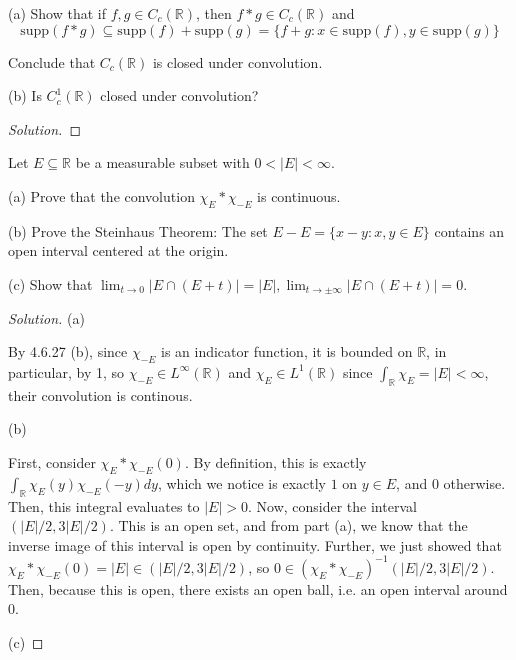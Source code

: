 \documentclass[10pt]{article}
\newcommand{\supp}{{\text{supp}}}
\newenvironment{problem}[2][Problem]{\begin{trivlist}
\item[\hskip \labelsep {\bfseries #1}\hskip \labelsep {\bfseries #2.}]}{\end{trivlist}}
\begin{document}
\begin{problem}{4.6.28}

(a) Show that if $f,g \in C_c(\mathbb{R})$, then $f \ast g \in C_c(\mathbb{R})$ and $$\supp(f \ast g) \subseteq \supp(f) + \supp(g) = \{ f + g : x \in \supp(f), y \in \supp(g) \}$$

Conclude that $C_c(\mathbb{R})$ is closed under convolution.

(b) Is $C_c^1(\mathbb{R})$ closed under convolution?

\end{problem}

\begin{proof}[Solution]


\end{proof}

\begin{problem}{4.6.29}

Let $E \subseteq \mathbb{R}$ be a measurable subset with $0 < |E| < \infty$.

(a) Prove that the convolution $\chi_E \ast \chi_{-E}$ is continuous.

(b) Prove the Steinhaus Theorem: The set $E - E = \{ x - y : x,y \in E\}$ contains an open interval centered at the origin.

(c) Show that $\lim_{t \to 0} | E \cap (E + t)| = |E|, \lim_{t \to \pm \infty} |E \cap (E + t)| = 0$.

\end{problem}

\begin{proof}[Solution]

(a)

By 4.6.27 (b), since $\chi_{-E}$ is an indicator function, it is bounded on $\mathbb{R}$, in particular, by 1, so $\chi_{-E} \in L^\infty(\mathbb{R})$ and $\chi_{E} \in L^1(\mathbb{R})$ since $\int_{\mathbb{R}} \chi_{E} = |E|< \infty$, their convolution is continous.

(b)

First, consider $\chi_E \ast \chi_{-E}(0)$. By definition, this is exactly $\int_{\mathbb{R}} \chi_E(y)\chi_{-E}(-y) dy$, which we notice is exactly $1$ on $y \in E$, and $0$ otherwise. Then, this integral evaluates to $|E| > 0$. Now, consider the interval $(|E|/2, 3|E|/2)$. This is an open set, and from part (a), we know that the inverse image of this interval is open by continuity. Further, we just showed that $\chi_E \ast \chi_{-E}(0) = |E| \in (|E|/2, 3|E|/2)$, so $0 \in (\chi_E \ast \chi_{-E})^{-1}(|E|/2, 3|E|/2)$. Then, because this is open, there exists an open ball, i.e. an open interval around 0.

(c)


\end{proof}
\end{document}
